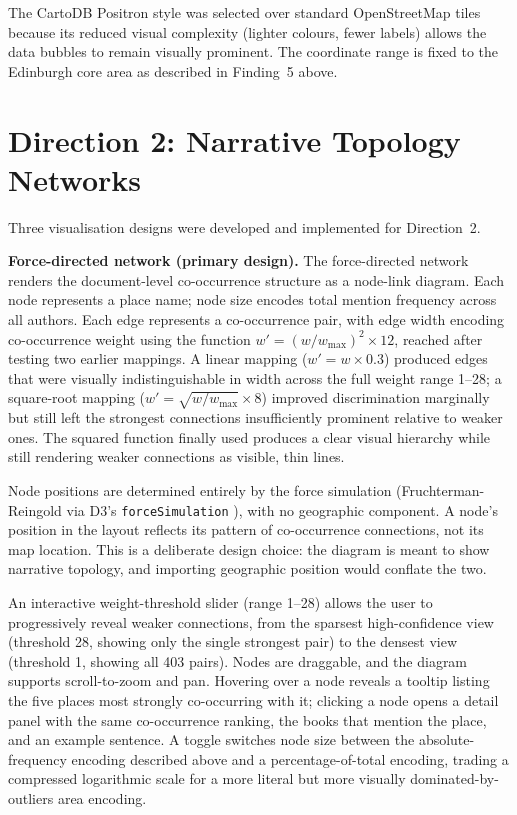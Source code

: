 \documentclass[logo,msc]{infthesis}
\begin{document}
The CartoDB Positron style was selected over standard OpenStreetMap tiles because its reduced visual complexity (lighter colours, fewer labels) allows the data bubbles to remain visually prominent. The coordinate range is fixed to the Edinburgh core area as described in Finding~5 above.
 
\section{Direction 2: Narrative Topology Networks}
\label{sec:direction2}

Three visualisation designs were developed and implemented for Direction~2.
 
\textbf{Force-directed network (primary design).} The force-directed network renders the document-level co-occurrence structure as a node-link diagram. Each node represents a place name; node size encodes total mention frequency across all authors. Each edge represents a co-occurrence pair, with edge width encoding co-occurrence weight using the function $w' = (w / w_{\max})^2 \times 12$, reached after testing two earlier mappings. A linear mapping ($w' = w \times 0.3$) produced edges that were visually indistinguishable in width across the full weight range 1--28; a square-root mapping ($w' = \sqrt{w/w_{\max}} \times 8$) improved discrimination marginally but still left the strongest connections insufficiently prominent relative to weaker ones. The squared function finally used produces a clear visual hierarchy while still rendering weaker connections as visible, thin lines.
 
Node positions are determined entirely by the force simulation (Fruchterman-Reingold \cite{fruchterman1991} via D3's \texttt{forceSimulation} \cite{bostock2011}), with no geographic component. A node's position in the layout reflects its pattern of co-occurrence connections, not its map location. This is a deliberate design choice: the diagram is meant to show narrative topology, and importing geographic position would conflate the two.
 
An interactive weight-threshold slider (range 1--28) allows the user to progressively reveal weaker connections, from the sparsest high-confidence view (threshold 28, showing only the single strongest pair) to the densest view (threshold 1, showing all 403 pairs). Nodes are draggable, and the diagram supports scroll-to-zoom and pan. Hovering over a node reveals a tooltip listing the five places most strongly co-occurring with it; clicking a node opens a detail panel with the same co-occurrence ranking, the books that mention the place, and an example sentence. A toggle switches node size between the absolute-frequency encoding described above and a percentage-of-total encoding, trading a compressed logarithmic scale for a more literal but more visually dominated-by-outliers area encoding.
 
\end{document}
